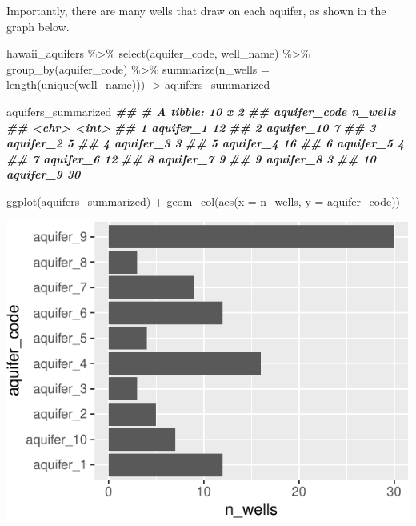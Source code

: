 \documentclass[
]{krantz}
\newenvironment{Shaded}{\begin{snugshade}}{\end{snugshade}}
\newcommand{\AttributeTok}[1]{\textcolor[rgb]{0.77,0.63,0.00}{#1}}
\newcommand{\DocumentationTok}[1]{\textcolor[rgb]{0.56,0.35,0.01}{\textbf{\textit{#1}}}}
\newcommand{\FunctionTok}[1]{\textcolor[rgb]{0.00,0.00,0.00}{#1}}
\newcommand{\NormalTok}[1]{#1}
\newcommand{\OtherTok}[1]{\textcolor[rgb]{0.56,0.35,0.01}{#1}}
\newcommand{\SpecialCharTok}[1]{\textcolor[rgb]{0.00,0.00,0.00}{#1}}
\begin{document}
Importantly, there are many wells that draw on each aquifer, as shown in the graph below.

\begin{Shaded}
\begin{Highlighting}[]
\NormalTok{hawaii\_aquifers }\SpecialCharTok{\%\textgreater{}\%}
  \FunctionTok{select}\NormalTok{(aquifer\_code, well\_name) }\SpecialCharTok{\%\textgreater{}\%}
  \FunctionTok{group\_by}\NormalTok{(aquifer\_code) }\SpecialCharTok{\%\textgreater{}\%}
  \FunctionTok{summarize}\NormalTok{(}\AttributeTok{n\_wells =} \FunctionTok{length}\NormalTok{(}\FunctionTok{unique}\NormalTok{(well\_name))) }\OtherTok{{-}\textgreater{}}\NormalTok{ aquifers\_summarized}

\NormalTok{aquifers\_summarized}
\DocumentationTok{\#\# \# A tibble: 10 x 2}
\DocumentationTok{\#\#    aquifer\_code n\_wells}
\DocumentationTok{\#\#    \textless{}chr\textgreater{}          \textless{}int\textgreater{}}
\DocumentationTok{\#\#  1 aquifer\_1         12}
\DocumentationTok{\#\#  2 aquifer\_10         7}
\DocumentationTok{\#\#  3 aquifer\_2          5}
\DocumentationTok{\#\#  4 aquifer\_3          3}
\DocumentationTok{\#\#  5 aquifer\_4         16}
\DocumentationTok{\#\#  6 aquifer\_5          4}
\DocumentationTok{\#\#  7 aquifer\_6         12}
\DocumentationTok{\#\#  8 aquifer\_7          9}
\DocumentationTok{\#\#  9 aquifer\_8          3}
\DocumentationTok{\#\# 10 aquifer\_9         30}

\FunctionTok{ggplot}\NormalTok{(aquifers\_summarized) }\SpecialCharTok{+} \FunctionTok{geom\_col}\NormalTok{(}\FunctionTok{aes}\NormalTok{(}\AttributeTok{x =}\NormalTok{ n\_wells, }\AttributeTok{y =}\NormalTok{ aquifer\_code))}
\end{Highlighting}
\end{Shaded}

\begin{center}\includegraphics[width=1\linewidth]{index_files/figure-latex/unnamed-chunk-136-1} \end{center}
\end{document}
